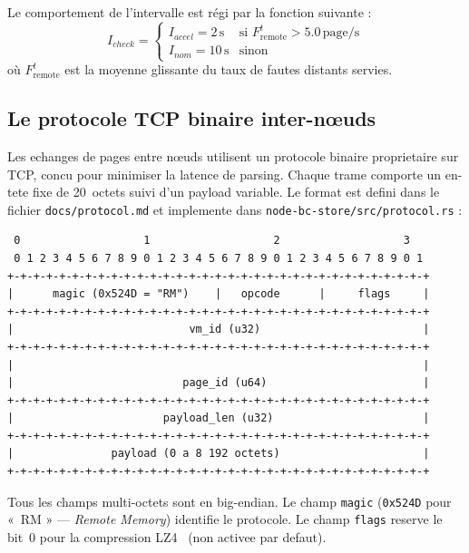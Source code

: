 Le comportement de l'intervalle est régi par la fonction suivante :
\begin{equation}
    \label{eq:adaptive-interval}
    I_{check} =
    \begin{cases}
        I_{accel} = 2\,\text{s} & \text{si } F_{\text{remote}}^t > 5.0\,\text{page/s} \\
        I_{nom} = 10\,\text{s} & \text{sinon}
    \end{cases}
\end{equation}
o\`u $F_{\text{remote}}^t$ est la moyenne glissante du taux de fautes distants servies.

\subsection{Le protocole TCP binaire inter-nœuds}
\label{subsec:protocole-tcp}

Les echanges de pages entre nœuds utilisent un protocole binaire proprietaire sur TCP, concu pour minimiser la latence de parsing. Chaque trame comporte un en-tete fixe de 20~octets suivi d'un payload variable. Le format est defini dans le fichier \texttt{docs/protocol.md} et implemente dans \texttt{node-bc-store/src/protocol.rs} :

\begin{verbatim}
 0                   1                   2                   3
 0 1 2 3 4 5 6 7 8 9 0 1 2 3 4 5 6 7 8 9 0 1 2 3 4 5 6 7 8 9 0 1
+-+-+-+-+-+-+-+-+-+-+-+-+-+-+-+-+-+-+-+-+-+-+-+-+-+-+-+-+-+-+-+-+
|      magic (0x524D = "RM")    |   opcode      |     flags     |
+-+-+-+-+-+-+-+-+-+-+-+-+-+-+-+-+-+-+-+-+-+-+-+-+-+-+-+-+-+-+-+-+
|                           vm_id (u32)                         |
+-+-+-+-+-+-+-+-+-+-+-+-+-+-+-+-+-+-+-+-+-+-+-+-+-+-+-+-+-+-+-+-+
|                                                               |
|                          page_id (u64)                        |
+-+-+-+-+-+-+-+-+-+-+-+-+-+-+-+-+-+-+-+-+-+-+-+-+-+-+-+-+-+-+-+-+
|                       payload_len (u32)                       |
+-+-+-+-+-+-+-+-+-+-+-+-+-+-+-+-+-+-+-+-+-+-+-+-+-+-+-+-+-+-+-+-+
|               payload (0 a 8 192 octets)                      |
+-+-+-+-+-+-+-+-+-+-+-+-+-+-+-+-+-+-+-+-+-+-+-+-+-+-+-+-+-+-+-+-+
\end{verbatim}

Tous les champs multi-octets sont en big-endian. Le champ \texttt{magic} (\texttt{0x524D} pour «~RM » --- \textit{Remote Memory}) identifie le protocole. Le champ \texttt{flags} reserve le bit~0 pour la compression LZ4~\cite{lz4_compression} (non activee par defaut).

